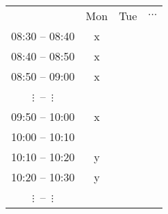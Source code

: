 \begin{tabular}{|c||c|c|c|}
  \hline & Mon & Tue & $\cdots$ \\
  \hhline{|=#=|=|=|}
  08:30 -- 08:40 & x & & \\\hline
  08:40 -- 08:50 & x & & \\\hline
  08:50 -- 09:00 & x & & \\\hline
  $\vdots$\quad~--~\quad$\vdots$ & & & \\\hline
  09:50 -- 10:00 & x & & \\\hline
  10:00 -- 10:10 &   & & \\\hline
  10:10 -- 10:20 & y & & \\\hline
  10:20 -- 10:30 & y & & \\\hline
  $\vdots$\quad~--~\quad$\vdots$ & & & \\\hline
\end{tabular}
